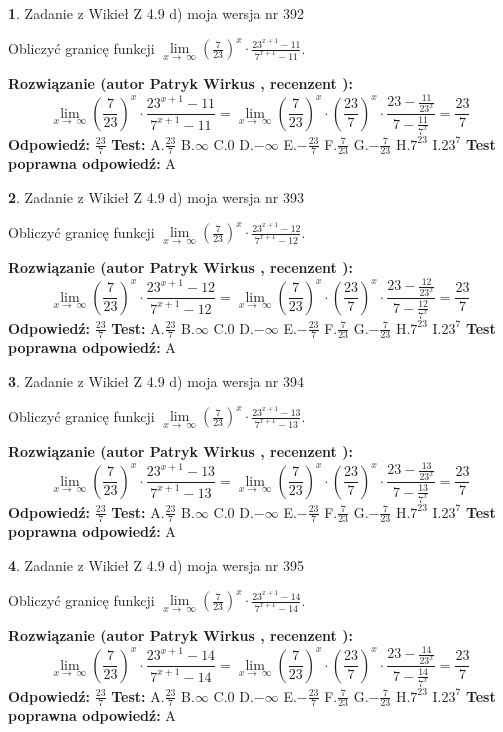 \documentclass[12pt, a4paper]{article}
\theoremstyle{definition} %
\newtheorem{zad}{}
\newcommand{\zadStart}[1]{\begin{zad}#1\newline}
\newcommand{\zadStop}{\end{zad}}
\newcommand{\rozwStart}[2]{\noindent \textbf{Rozwiązanie (autor #1 , recenzent #2): }\newline}
\newcommand{\rozwStop}{\newline}
\newcommand{\odpStart}{\noindent \textbf{Odpowiedź:}\newline}
\newcommand{\odpStop}{\newline}
\newcommand{\testStart}{\noindent \textbf{Test:}\newline}
\newcommand{\testStop}{\newline}
\newcommand{\kluczStart}{\noindent \textbf{Test poprawna odpowiedź:}\newline}
\newcommand{\kluczStop}{\newline}
\begin{document}
\zadStart{Zadanie z Wikieł Z 4.9 d) moja wersja nr 392}


Obliczyć granicę funkcji  $\lim\limits_{x\to\ \infty}(\frac{7}{23})^{x}\cdot\frac{23^{x+1}-11}{7^{x+1}-11}$.
\zadStop
\rozwStart{Patryk Wirkus}{}
$$\lim\limits_{x\to\ \infty}(\frac{7}{23})^{x}\cdot\frac{23^{x+1}-11}{7^{x+1}-11}=\lim\limits_{x\to\ \infty}(\frac{7}{23})^{x}\cdot(\frac{23}{7})^{x} \cdot \frac{23-\frac{11}{23^{x}}}{7-\frac{11}{7^{x}}} = \frac{23}{7}$$
\rozwStop
\odpStart
$\frac{23}{7}$
\odpStop
\testStart
A.$\frac{23}{7}$ B.$\infty$ C.$0$ D.$-\infty$ E.$-\frac{23}{7}$
F.$\frac{7}{23}$ G.$-\frac{7}{23}$
H.$7^{23}$
I.$23^{7}$
\testStop
\kluczStart
A
\kluczStop



\zadStart{Zadanie z Wikieł Z 4.9 d) moja wersja nr 393}


Obliczyć granicę funkcji  $\lim\limits_{x\to\ \infty}(\frac{7}{23})^{x}\cdot\frac{23^{x+1}-12}{7^{x+1}-12}$.
\zadStop
\rozwStart{Patryk Wirkus}{}
$$\lim\limits_{x\to\ \infty}(\frac{7}{23})^{x}\cdot\frac{23^{x+1}-12}{7^{x+1}-12}=\lim\limits_{x\to\ \infty}(\frac{7}{23})^{x}\cdot(\frac{23}{7})^{x} \cdot \frac{23-\frac{12}{23^{x}}}{7-\frac{12}{7^{x}}} = \frac{23}{7}$$
\rozwStop
\odpStart
$\frac{23}{7}$
\odpStop
\testStart
A.$\frac{23}{7}$ B.$\infty$ C.$0$ D.$-\infty$ E.$-\frac{23}{7}$
F.$\frac{7}{23}$ G.$-\frac{7}{23}$
H.$7^{23}$
I.$23^{7}$
\testStop
\kluczStart
A
\kluczStop



\zadStart{Zadanie z Wikieł Z 4.9 d) moja wersja nr 394}


Obliczyć granicę funkcji  $\lim\limits_{x\to\ \infty}(\frac{7}{23})^{x}\cdot\frac{23^{x+1}-13}{7^{x+1}-13}$.
\zadStop
\rozwStart{Patryk Wirkus}{}
$$\lim\limits_{x\to\ \infty}(\frac{7}{23})^{x}\cdot\frac{23^{x+1}-13}{7^{x+1}-13}=\lim\limits_{x\to\ \infty}(\frac{7}{23})^{x}\cdot(\frac{23}{7})^{x} \cdot \frac{23-\frac{13}{23^{x}}}{7-\frac{13}{7^{x}}} = \frac{23}{7}$$
\rozwStop
\odpStart
$\frac{23}{7}$
\odpStop
\testStart
A.$\frac{23}{7}$ B.$\infty$ C.$0$ D.$-\infty$ E.$-\frac{23}{7}$
F.$\frac{7}{23}$ G.$-\frac{7}{23}$
H.$7^{23}$
I.$23^{7}$
\testStop
\kluczStart
A
\kluczStop



\zadStart{Zadanie z Wikieł Z 4.9 d) moja wersja nr 395}


Obliczyć granicę funkcji  $\lim\limits_{x\to\ \infty}(\frac{7}{23})^{x}\cdot\frac{23^{x+1}-14}{7^{x+1}-14}$.
\zadStop
\rozwStart{Patryk Wirkus}{}
$$\lim\limits_{x\to\ \infty}(\frac{7}{23})^{x}\cdot\frac{23^{x+1}-14}{7^{x+1}-14}=\lim\limits_{x\to\ \infty}(\frac{7}{23})^{x}\cdot(\frac{23}{7})^{x} \cdot \frac{23-\frac{14}{23^{x}}}{7-\frac{14}{7^{x}}} = \frac{23}{7}$$
\rozwStop
\odpStart
$\frac{23}{7}$
\odpStop
\testStart
A.$\frac{23}{7}$ B.$\infty$ C.$0$ D.$-\infty$ E.$-\frac{23}{7}$
F.$\frac{7}{23}$ G.$-\frac{7}{23}$
H.$7^{23}$
I.$23^{7}$
\testStop
\kluczStart
A
\kluczStop
\end{document}
